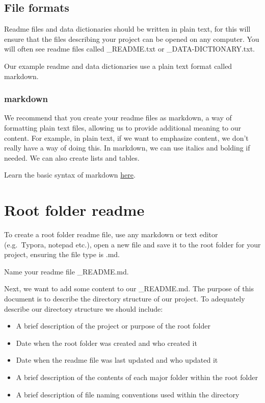 \documentclass[
]{book}
\providecommand{\tightlist}{%
  \setlength{\itemsep}{0pt}\setlength{\parskip}{0pt}}
\begin{document}
\hypertarget{file-formats}{%
\subsection*{File formats}\label{file-formats}}

Readme files and data dictionaries should be written in plain text, for this will ensure that the files describing your project can be opened on any computer. You will often see readme files called \_README.txt or \_DATA-DICTIONARY.txt.

Our example readme and data dictionaries use a plain text format called markdown.

\hypertarget{markdown}{%
\subsubsection*{markdown}\label{markdown}}

We recommend that you create your readme files as markdown, a way of formatting plain text files, allowing us to provide additional meaning to our content. For example, in plain text, if we want to emphasize content, we don't really have a way of doing this. In markdown, we can use italics and bolding if needed. We can also create lists and tables.

Learn the basic syntax of markdown \href{https://ubco-biology.github.io/Procedures-and-Guidelines/markdown-1.html}{here}.

\hypertarget{root-folder-readme}{%
\section{Root folder readme}\label{root-folder-readme}}

To create a root folder readme file, use any markdown or text editor (e.g.~Typora, notepad etc.), open a new file and save it to the root folder for your project, ensuring the file type is .md.

Name your readme file \_README.md.

Next, we want to add some content to our \_README.md. The purpose of this document is to describe the directory structure of our project. To adequately describe our directory structure we should include:

\begin{itemize}
\tightlist
\item
  A brief description of the project or purpose of the root folder
\item
  Date when the root folder was created and who created it
\item
  Date when the readme file was last updated and who updated it
\item
  A brief description of the contents of each major folder within the root folder
\item
  A brief description of file naming conventions used within the directory
\end{itemize}
\end{document}
